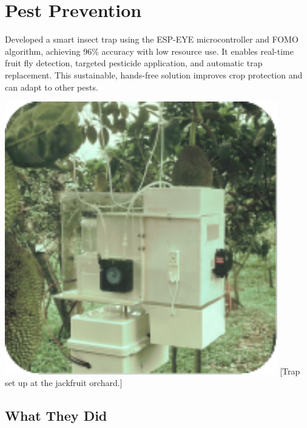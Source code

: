 \documentclass[../../main]{subfiles}
\begin{document}
\section{Pest Prevention} \label{sec:}

\begin{minipage} {0.62\textwidth}
    \vspace{-0.8cm}

    Developed a smart insect trap using the ESP-EYE microcontroller and FOMO
    algorithm, achieving 96\% accuracy with low resource use. It enables
    real-time fruit fly detection, targeted pesticide application, and
    automatic trap replacement. This sustainable, hands-free solution improves
    crop protection and can adapt to other pests.

\end{minipage}
\hfill
\begin{minipage} {0.35\textwidth}
    \begin{center}
        \vspace{-1.2cm}
        \includegraphics[width = 0.89\textwidth] {pics/trap.pdf}
        [Trap set up at the jackfruit orchard.]{}
        \label{fig:case3Pic}
    \end{center}
\end{minipage}

\subsection{What They Did}
\end{document}
